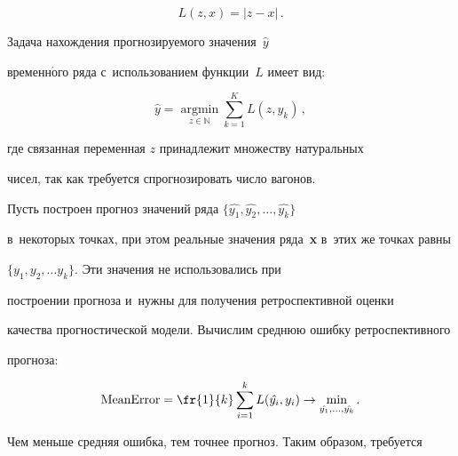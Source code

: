 \begin{equation}


\label{loss}


    L(z,x) = |z-x|\,.


\end{equation}





Задача нахождения прогнозируемого значения~$\hat{y}$


временн$\acute{\mbox{о}}$го ряда с~использованием функции~$L$ имеет вид:


\begin{equation*}




   \hat{y} = \mathop{\mathrm{argmin}}\limits_{z\in\mathbb{N}}


   \sum\limits_{k=1}^K{L(z,y_k)}\,,


\end{equation*}


где связанная переменная $z$ принадлежит множеству натуральных


чисел, так как требуется спрогнозировать число вагонов.





Пусть построен прогноз значений ряда $\{\hat{y_1}, \hat{y_2},\ldots, \hat{y_k}\}$


в~некоторых точках, при этом реальные значения ряда~\textbf{x} в~этих же точках равны


$\{{y_1}, {y_2}, \ldots {y_k}\}$. Эти значения не использовались при


построении прогноза и~нужны для получения ретроспективной оценки


качества прогностической модели. Вычислим среднюю ошибку ретроспективного


прогноза:


\begin{equation}


\label{MeanEr}


\text{MeanError} = \fr{1}{k}\sum\limits_{i=1}^{k} L(\hat{y_i}, y_i) \to


\min\limits_{\hat{y_1},\ldots ,\hat{y_k}}.


\end {equation}





Чем меньше средняя ошибка, тем точнее прогноз. Таким образом, требуется


